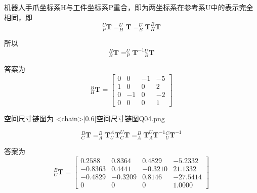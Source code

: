 \documentclass{homework}
\begin{document}
\begin{sol}

  机器人手爪坐标系{H}与工件坐标系{P}重合，即为两坐标系在参考系{U}中的表示完全相同，即
  \[
    _P^U\mathbf{T} = _H^U\mathbf{T} = _B^U\mathbf{T} _H^B\mathbf{T}
  \]

  所以
  \[
    _B^H\mathbf{T} = _P^U\mathbf{T}^{-1} {_B^U}\mathbf{T}
  \]

  答案为
  \[
    _H^B\mathbf{T} =
    \begin{bmatrix}
      0 & 0 & -1 & -5 \\
      1 & 0 & 0 & 2 \\
      0 & -1 & 0 & -2 \\
      0 & 0 & 0 & 1
    \end{bmatrix}
  \]

\end{sol}

\question 

\begin{sol}

  空间尺寸链图为
  \img<chain>[0.6]{空间尺寸链图}{Q04.png}

  \[
    _C^B\mathbf{T} = _A^B\mathbf{T}  _U^A\mathbf{T} _C^U\mathbf{T} = _A^B\mathbf{T}  _A^U\mathbf{T}^{-1} {_U^C}\mathbf{T}^{-1}  
  \]

  答案为
  \[
    _C^B\mathbf{T} =
    \begin{bmatrix}
      0.2588 & 0.8364 & 0.4829 & -5.2332 \\
      -0.8363 & 0.4441 & -0.3210 & 21.1332 \\
      -0.4829 & -0.3209 & 0.8146 & -27.5414 \\
      0 & 0 & 0 & 1.0000
    \end{bmatrix}
  \]

\end{sol}

\question 
\end{document}
